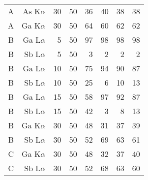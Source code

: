 \begin{table}[phtb]
\begin{center}
\begin{tabular}{rrrrrrrr}
            A               & As K$\alpha$  & 30             & 50             & 36                        & 40                     & 38                     & 38                     \\
            A               & Ga K$\alpha$  & 30             & 50             & 64                        & 60                     & 62                     & 62                     \\
            \hline
            B               & Ga L$\alpha$  & 5              & 50             & 97                        & 98                     & 98                     & 98                     \\
            B               & Sb L$\alpha$  & 5              & 50             & 3                         & 2                      & 2                      & 2                      \\
            B               & Ga L$\alpha$  & 10             & 50             & 75                        & 94                     & 90                     & 87                     \\
            B               & Sb L$\alpha$  & 10             & 50             & 25                        & 6                      & 10                     & 13                     \\
            B               & Ga L$\alpha$  & 15             & 50             & 58                        & 97                     & 92                     & 87                     \\
            B               & Sb L$\alpha$  & 15             & 50             & 42                        & 3                      & 8                      & 13                     \\
            B               & Ga K$\alpha$  & 30             & 50             & 48                        & 31                     & 37                     & 39                     \\
            B               & Sb L$\alpha$  & 30             & 50             & 52                        & 69                     & 63                     & 61                     \\
            \hline
            C               & Ga K$\alpha$  & 30             & 50             & 48                        & 32                     & 37                     & 40                     \\
            C               & Sb L$\alpha$  & 30             & 50             & 52                        & 68                     & 63                     & 60                     \\

\end{tabular}
\end{center}
\end{table}
